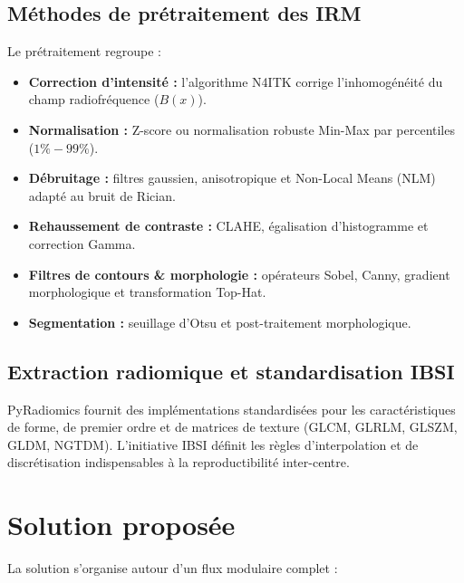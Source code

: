 \documentclass[12pt,a4paper]{report}
\begin{document}
    \subsection{Méthodes de prétraitement des IRM}
    Le prétraitement regroupe :
    \begin{itemize}
        \item \textbf{Correction d'intensité :} l'algorithme N4ITK corrige l'inhomogénéité du champ radiofréquence ($B(x)$).
        \item \textbf{Normalisation :} Z-score ou normalisation robuste Min-Max par percentiles ($1\%-99\%$).
        \item \textbf{Débruitage :} filtres gaussien, anisotropique et Non-Local Means (NLM) adapté au bruit de Rician.
        \item \textbf{Rehaussement de contraste :} CLAHE, égalisation d'histogramme et correction Gamma.
        \item \textbf{Filtres de contours \& morphologie :} opérateurs Sobel, Canny, gradient morphologique et transformation Top-Hat.
        \item \textbf{Segmentation :} seuillage d'Otsu et post-traitement morphologique.
    \end{itemize}

    \subsection{Extraction radiomique et standardisation IBSI}
    PyRadiomics fournit des implémentations standardisées pour les caractéristiques de forme, de premier ordre et de matrices de texture (GLCM, GLRLM, GLSZM, GLDM, NGTDM). L'initiative IBSI définit les règles d'interpolation et de discrétisation indispensables à la reproductibilité inter-centre.

    \section{Solution proposée}
    
    La solution s'organise autour d'un flux modulaire complet :
    
\end{document}
